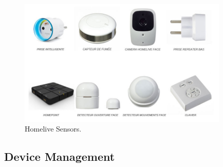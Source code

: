 \begin{figure}[htbp]
	\centering
		\includegraphics[width=10cm]{Figures/home-live_capteurs.jpg}
	\caption[Homelive Sensors]{Homelive Sensors.}%
	\label{fig:2}
\end{figure}

\subsection{Device Management}



